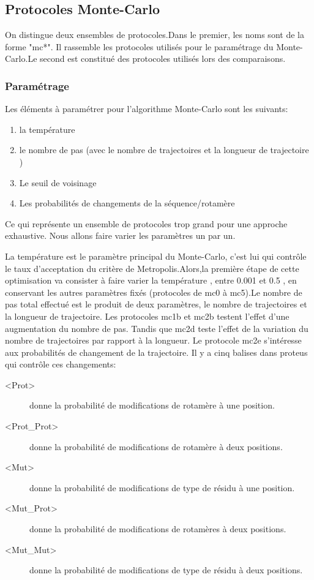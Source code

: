    \subsection{Protocoles Monte-Carlo}
\label{sec:MC}
On distingue deux ensembles de protocoles.Dans le premier, les noms  sont de la forme "mc*". Il rassemble les protocoles utilisés pour le paramétrage du Monte-Carlo.Le second est constitué des protocoles utilisés lors des comparaisons.     

\subsubsection{Paramétrage}

Les éléments à paramétrer pour l'algorithme Monte-Carlo sont les suivants:

\begin{enumerate}
\item la température
\item le nombre de pas (avec le nombre de trajectoires et la longueur de trajectoire )
\item Le seuil de voisinage
\item Les probabilités de changements de la séquence/rotamère
\end{enumerate}

Ce qui représente un ensemble de protocoles trop grand pour une approche exhaustive. Nous allons faire varier les paramètres un par un.

La température est le paramètre principal du Monte-Carlo, c'est lui qui contrôle le taux d'acceptation du critère de Metropolis.Alors,la première étape de cette optimisation va consister à faire varier la température , entre 0.001 et 0.5 , en conservant les autres paramètres fixés (protocoles de mc0 à mc5).Le nombre de pas total effectué est le produit de deux paramètres, le nombre de trajectoires et la longueur de trajectoire. Les protocoles mc1b et mc2b testent l'effet d'une augmentation du nombre de pas. Tandis que mc2d teste l'effet de la variation du nombre de trajectoires par rapport à la longueur.
Le protocole mc2e s'intéresse aux probabilités de changement de la trajectoire. Il y a cinq balises dans proteus qui contrôle ces changements:

\begin{description}
\item[<Prot>] donne la probabilité de modifications de  rotamère à une position.
\item[<Prot\_Prot>] donne la probabilité de modifications de  rotamère à deux positions.
\item[<Mut>] donne la probabilité de modifications de type de résidu à une position.
\item[<Mut\_Prot>] donne la probabilité de modifications de  rotamères à deux positions.
\item[<Mut\_Mut>] donne la probabilité de modifications de type de résidu à deux positions.
\end{description}

